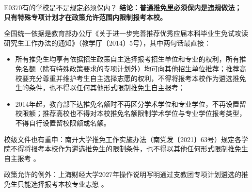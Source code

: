 \begin{qa}{E0370}{有的学校是不是规定必须保内？}
\textbf{结论：普通推免里必须保内是违规做法；只有特殊专项计划才在政策允许范围内限制报考本校。}

全国统一依据是教育部办公厅《关于进一步完善推荐优秀应届本科毕业生免试攻读研究生工作办法的通知》（教学厅〔2014〕5号），其中两句话最直接：

\begin{itemize}
  \item 所有推免生均享有依据招生政策自主选择报考招生单位和专业的权利，所有推免名额（除有特殊政策要求的专项计划外）均可向其他招生单位推荐；推荐高校要充分尊重并维护考生自主选择志愿的权利，不得将报考本校作为遴选推免生的条件，也不得以任何其他形式限制推免生自主报考；
  \item 2014年起，教育部下达推免名额时不再区分学术学位和专业学位，不再设置留校限额；推荐高校也不得对本校推免名额限制学术学位与专业学位报考类型，不得自行设置留校限额或名额。
\end{itemize}

校级文件也有重申：南开大学推免工作实施办法（南党发〔2021〕63号）规定各学院不得将报考本校作为遴选推免生的限制条件，也不得以其他任何形式限制推免生自主报考 。

政策允许的例外：上海财经大学2027年操作说明写明通过支教团专项计划遴选的推免生只能选择报考本校专业志愿 。
\end{qa}

